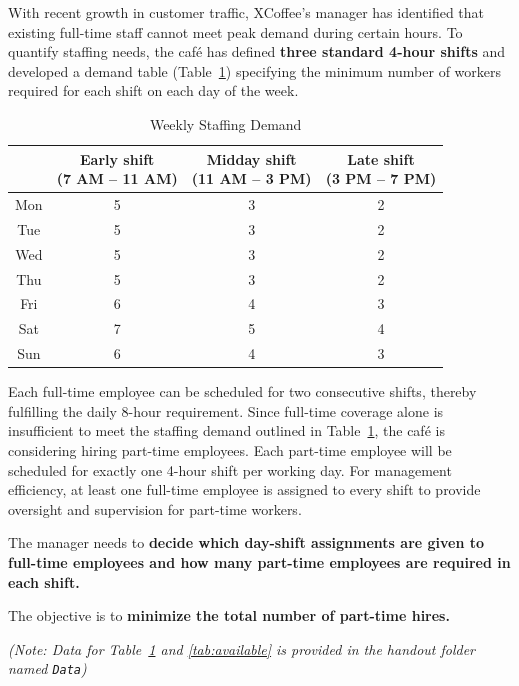 \documentclass[11pt, letter, answers]{exam}
\begin{document}
With recent growth in customer traffic, XCoffee’s manager has identified that existing full-time staff cannot meet peak demand during certain hours. To quantify staffing needs, the café has defined \textbf{three standard 4-hour shifts} and developed a demand table (Table~\ref{tab:demand}) specifying the minimum number of workers required for each shift on each day of the week.

\begin{table}[h!]
    \centering
    \begin{tabular}{cccc}
        \hline
         & \makecell[c]{Early shift\\(7 AM – 11 AM)} & \makecell[c]{Midday shift\\(11 AM – 3 PM)} & \makecell[c]{Late shift\\(3 PM – 7 PM)} \\
        \hline
        Mon & 5 & 3 & 2 \\
        Tue & 5 & 3 & 2 \\
        Wed & 5 & 3 & 2 \\
        Thu & 5 & 3 & 2 \\
        Fri & 6 & 4 & 3 \\
        Sat & 7 & 5 & 4 \\
        Sun & 6 & 4 & 3 \\
        \hline
    \end{tabular}
    \caption{Weekly Staffing Demand}
    \label{tab:demand}
\end{table}

Each full-time employee can be scheduled for two consecutive shifts, thereby fulfilling the daily 8-hour requirement. Since full-time coverage alone is insufficient to meet the staffing demand outlined in Table~\ref{tab:demand}, the café is considering hiring part-time employees. Each part-time employee will be scheduled for exactly one 4-hour shift per working day. For management efficiency, at least one full-time employee is assigned to every shift to provide oversight and supervision for part-time workers.

The manager needs to \textbf{decide which day-shift assignments are given to full-time employees and how many part-time employees are required in each shift.} 

The objective is to \textbf{minimize the total number of part-time hires.}

\textit{(Note: Data for Table~\ref{tab:demand} and \ref{tab:available} is provided in the handout folder named \textup{\texttt{Data}})} 
\end{document}
